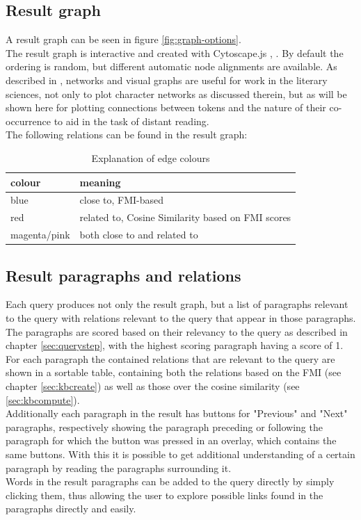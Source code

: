 \subsection{Result graph}
\label{sec:resultgraph}
A result graph can be seen in figure \ref{fig:graph-options}.\\
The result graph is interactive and created with Cytoscape.js \cite{doi:10.1093/bioinformatics/btv557}, \cite{Cytoscapejs}. By default the ordering is random, but different automatic node alignments are available. As described in \cite{moretti2011network}, networks and visual graphs are useful for work in the literary sciences, not only to plot character networks as discussed therein, but as will be shown here for plotting connections between tokens and the nature of their co-occurrence to aid in the task of distant reading.\\
The following relations can be found in the result graph:
\begin{table}[H]
\centering
    \begin{tabular}{|l|l|}
    \hline
    colour & meaning\\
    \hline
    blue & close to, FMI-based \\
    red &related to, Cosine Similarity based on FMI scores \\
    magenta/pink & both close to and related to\\
    \hline
\end{tabular}
\caption{Explanation of edge colours}
\label{tab:relation_meaning}
\end{table}

\subsection{Result paragraphs and relations}
Each query produces not only the result graph, but a list of paragraphs relevant to the query with relations relevant to the query that appear in those paragraphs.\\
The paragraphs are scored based on their relevancy to the query as described in chapter \ref{sec:querystep}, with the highest scoring paragraph having a score of 1. For each paragraph the contained relations that are relevant to the query are shown in a sortable table, containing both the relations based on the FMI (see chapter \ref{sec:kbcreate}) as well as those over the cosine similarity (see \ref{sec:kbcompute}).\\
Additionally each paragraph in the result has buttons for "Previous" and "Next" paragraphs, respectively showing the paragraph preceding or following the paragraph for which the button was pressed in an overlay, which contains the same buttons. With this it is possible to get additional understanding of a certain paragraph by reading the paragraphs surrounding it.\\
Words in the result paragraphs can be added to the query directly by simply clicking them, thus allowing the user to explore possible links found in the paragraphs directly and easily.




